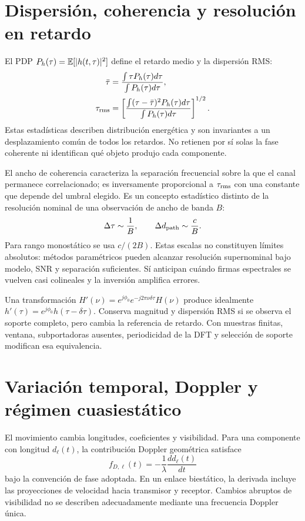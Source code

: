\section{Dispersión, coherencia y resolución en retardo}

El \ac{PDP} $P_h(\tau)=\mathbb{E}[|h(t,\tau)|^2]$ define el retardo medio y la dispersión
RMS:
\begin{align}
\bar\tau&=\frac{\int \tau P_h(\tau)d\tau}{\int P_h(\tau)d\tau},\\
\tau_{\rm rms}&=\left[
\frac{\int(\tau-\bar\tau)^2P_h(\tau)d\tau}
{\int P_h(\tau)d\tau}\right]^{1/2}.
\label{eq:rms_delay}
\end{align}
Estas estadísticas describen distribución energética y son invariantes a un
desplazamiento común de todos los retardos. No retienen por sí solas la fase
coherente ni identifican qué objeto produjo cada componente.

El ancho de coherencia caracteriza la separación frecuencial sobre la que el
canal permanece correlacionado; es inversamente proporcional a
$\tau_{\rm rms}$ con una constante que depende del umbral elegido. Es un concepto
estadístico distinto de la resolución nominal de una observación de ancho de banda
$B$:
\begin{equation}
\Delta\tau\sim\frac{1}{B},\qquad
\Delta d_{\rm path}\sim\frac{c}{B}.
\label{eq:delay_resolution}
\end{equation}
Para rango monostático se usa $c/(2B)$. Estas escalas no constituyen límites
absolutos: métodos paramétricos pueden alcanzar resolución supernominal bajo
modelo, SNR y separación suficientes. Sí anticipan cuándo firmas espectrales se
vuelven casi colineales y la inversión amplifica errores.

Una transformación
$H'(\nu)=e^{j\phi_0}e^{-j2\pi\nu\delta\tau}H(\nu)$ produce idealmente
$h'(\tau)=e^{j\phi_0}h(\tau-\delta\tau)$. Conserva magnitud y dispersión RMS si
se observa el soporte completo, pero cambia la referencia de retardo. Con muestras
finitas, ventana, subportadoras ausentes, periodicidad de la DFT y selección de
soporte modifican esa equivalencia.

\section{Variación temporal, Doppler y régimen cuasiestático}

El movimiento cambia longitudes, coeficientes y visibilidad. Para una componente
con longitud $d_\ell(t)$, la contribución Doppler geométrica satisface
\begin{equation}
f_{D,\ell}(t)=-\frac{1}{\lambda}\frac{d d_\ell(t)}{dt}
\end{equation}
bajo la convención de fase adoptada. En un enlace biestático, la derivada incluye
las proyecciones de velocidad hacia transmisor y receptor. Cambios abruptos de
visibilidad no se describen adecuadamente mediante una frecuencia Doppler única.

